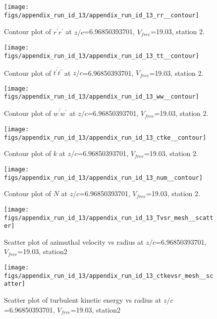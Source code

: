 \begin{figure}[H]
\centering
\texttt{[image: figs/appendix\_run\_id\_13/appendix\_run\_id\_13\_rr\_\_contour]}
\caption{Contour plot of $\overline{r^\prime r^\prime}$ at $z/c$=6.96850393701, $V_{free}$=19.03, station 2.}
\label{fig:appendix_run_id_13_rr__contour}
\end{figure}


\begin{figure}[H]
\centering
\texttt{[image: figs/appendix\_run\_id\_13/appendix\_run\_id\_13\_tt\_\_contour]}
\caption{Contour plot of $\overline{t^\prime t^\prime}$ at $z/c$=6.96850393701, $V_{free}$=19.03, station 2.}
\label{fig:appendix_run_id_13_tt__contour}
\end{figure}


\begin{figure}[H]
\centering
\texttt{[image: figs/appendix\_run\_id\_13/appendix\_run\_id\_13\_ww\_\_contour]}
\caption{Contour plot of $\overline{w^\prime w^\prime}$ at $z/c$=6.96850393701, $V_{free}$=19.03, station 2.}
\label{fig:appendix_run_id_13_ww__contour}
\end{figure}


\begin{figure}[H]
\centering
\texttt{[image: figs/appendix\_run\_id\_13/appendix\_run\_id\_13\_ctke\_\_contour]}
\caption{Contour plot of $k$ at $z/c$=6.96850393701, $V_{free}$=19.03, station 2.}
\label{fig:appendix_run_id_13_ctke__contour}
\end{figure}


\begin{figure}[H]
\centering
\texttt{[image: figs/appendix\_run\_id\_13/appendix\_run\_id\_13\_num\_\_contour]}
\caption{Contour plot of $N$ at $z/c$=6.96850393701, $V_{free}$=19.03, station 2.}
\label{fig:appendix_run_id_13_num__contour}
\end{figure}


\begin{figure}[H]
\centering
\texttt{[image: figs/appendix\_run\_id\_13/appendix\_run\_id\_13\_Tvsr\_mesh\_\_scatter]}
\caption{Scatter plot of azimuthal velocity vs radius at $z/c$=6.96850393701, $V_{free}$=19.03, station2}
\label{fig:appendix_run_id_13_Tvsr_mesh__scatter}
\end{figure}


\begin{figure}[H]
\centering
\texttt{[image: figs/appendix\_run\_id\_13/appendix\_run\_id\_13\_ctkevsr\_mesh\_\_scatter]}
\caption{Scatter plot of turbulent kinetic energy vs radius at $z/c$=6.96850393701, $V_{free}$=19.03, station2}
\label{fig:appendix_run_id_13_ctkevsr_mesh__scatter}
\end{figure}


